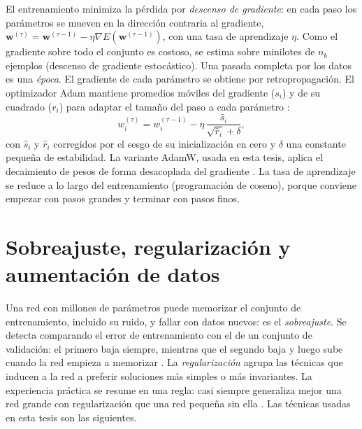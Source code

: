 El entrenamiento minimiza la pérdida por \emph{descenso de gradiente}: en
cada paso los parámetros se mueven en la dirección contraria al gradiente,
$\mathbf{w}^{(\tau)} = \mathbf{w}^{(\tau-1)} - \eta \nabla E(\mathbf{w}^{(\tau-1)})$,
con una tasa de aprendizaje $\eta$. Como el
gradiente sobre todo el conjunto es costoso, se estima sobre minilotes de
$n_b$ ejemplos (descenso de gradiente estocástico). Una pasada completa por
los datos es una \emph{época}. El gradiente de cada parámetro se obtiene por
retropropagación. El optimizador Adam mantiene promedios móviles del
gradiente ($s_i$) y de su cuadrado ($r_i$) para adaptar el tamaño del paso a
cada parámetro \citep[pp.~222--224]{bishop2024deep}:
\begin{equation}
  w_i^{(\tau)} = w_i^{(\tau-1)} - \eta\, \frac{\hat{s}_i}{\sqrt{\hat{r}_i} + \delta},
  \label{eq:adam}
\end{equation}
con $\hat{s}_i$ y $\hat{r}_i$ corregidos por el sesgo de su inicialización en
cero y $\delta$ una constante pequeña de estabilidad. La variante AdamW,
usada en esta tesis, aplica el decaimiento de pesos de forma desacoplada del
gradiente \citep{loshchilov2019adamw}. La tasa de aprendizaje se reduce a
lo largo del entrenamiento (programación de coseno), porque conviene
empezar con pasos grandes y terminar con pasos finos.

\section{Sobreajuste, regularización y aumentación de datos}\label{sec:teoria-regularizacion}

Una red con millones de parámetros puede memorizar el conjunto de
entrenamiento, incluido su ruido, y fallar con datos nuevos: es el
\emph{sobreajuste}. Se detecta comparando el error de entrenamiento con el de
un conjunto de validación: el primero baja siempre, mientras que el segundo
baja y luego sube cuando la red empieza a memorizar \citep[pp.~266--267]{bishop2024deep}.
La \emph{regularización} agrupa las técnicas que inducen a la red a preferir
soluciones más simples o más invariantes. La experiencia práctica se resume
en una regla: casi siempre generaliza mejor una red grande con
regularización que una red pequeña sin ella \citep[p.~254]{bishop2024deep}.
Las técnicas usadas en esta tesis son las siguientes.

